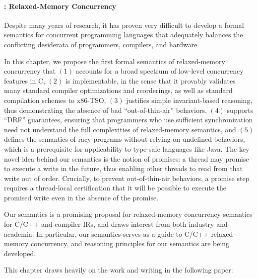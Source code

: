 
\paragraph{: Relaxed-Memory Concurrency}

Despite many years of research, it has proven very difficult to develop a formal semantics for
concurrent programming languages that adequately balances the conflicting desiderata of programmers,
compilers, and hardware.

In this chapter, we propose the first formal semantics of relaxed-memory concurrency that $(1)$
accounts for a broad spectrum of low-level concurrency features in C, $(2)$ is implementable, in the
sense that it provably validates many standard compiler optimizations and reorderings, as well as
standard compilation schemes to x86-TSO, $(3)$ justifies simple invariant-based reasoning, thus
demonstrating the absence of bad ``out-of-thin-air'' behaviors, $(4)$ supports ``DRF'' guarantees,
ensuring that programmers who use sufficient synchronization need not understand the full
complexities of relaxed-memory semantics, and $(5)$ defines the semantics of racy programs without
relying on undefined behaviors, which is a prerequisite for applicability to type-safe languages
like Java.  The key novel idea behind our semantics is the notion of promises: a thread may promise
to execute a write in the future, thus enabling other threads to read from that write out of order.
Crucially, to prevent out-of-thin-air behaviors, a promise step requires a thread-local
certification that it will be possible to execute the promised write even in the absence of the
promise.

  Our semantics is a promising proposal for relaxed-memory concurrency
semantics for C/C++ and compiler IRs, and draws interest from both industry and academia.  In
particular, our semantics serves as a guide to C/C++ relaxed-memory concurrency, and reasoning
principles for our semantics are being developed.

This chapter draws heavily on the work and writing in the following paper:



